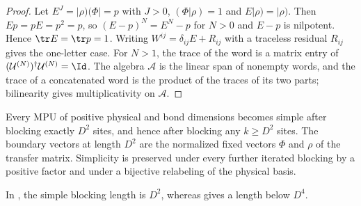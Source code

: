 \begin{proof}\leanok
    Let $E^J=|\rho)(\Phi|=p$ with $J>0$, $(\Phi|\rho)=1$ and $E|\rho)=|\rho)$.
    Then $Ep=pE=p^2=p$, so $(E-p)^N=E^N-p$ for $N>0$ and $E-p$ is nilpotent.
    Hence $\tr E=\tr p=1$.  Writing $W^{ij}=\delta_{ij}E+R_{ij}$ with a
    traceless residual $R_{ij}$ gives the one-letter case.  For $N>1$, the
    trace of the word is a matrix entry of
    $(\mathcal U^{(N)})^\dagger\mathcal U^{(N)}=\Id$.  The algebra
    $\mathcal A$ is the linear span of nonempty words, and the trace of a
    concatenated word is the product of the traces of its two parts;
    bilinearity gives multiplicativity on $\mathcal A$.
\end{proof}

\begin{theorem}
    \label{thm:mpu_bounded_simple_blocking}
    \leanok
    Every MPU of positive physical and bond dimensions becomes simple after
    blocking exactly $D^2$ sites, and hence after blocking any $k\geq D^2$
    sites.  The boundary vectors at length $D^2$ are the normalized fixed vectors
    $\Phi$ and $\rho$ of the transfer matrix.  Simplicity is preserved under
    every further iterated blocking by a positive factor and under a
    bijective relabeling of the physical basis.

    In \cite[Theorem~2]{Sahinoglu2018LocalityPreserving}, the simple blocking length is $D^2$, whereas
    \cite[Proposition~III.3(ii)]{Cirac2017MPU} gives a length below
    $D^4$.
\end{theorem}


